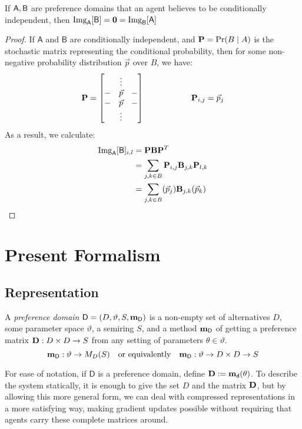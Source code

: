 \documentclass{article}
\begin{document}
	\begin{prop} \label{prop:conditionalindep}
		If $\sf A, B$ are preference domains that an agent believes to be conditionally independent, then $\mathrm{Img}_{\sf A}[{\sf B}] = \mathbf 0 = \mathrm{Img}_{\sf B}[{\sf A}] $
	\end{prop}
	\begin{proof}
		If $\mathsf A$ and $\mathsf B$ are conditionally independent, and $\mathbf P = \Pr(B \mid A)$ is the stochastic matrix representing the conditional probability, then for some non-negative probability distribution $\vec p$ over $B$, we have:
		\[ \mathbf P = \begin{bmatrix}
			& \vdots& \\
			- & \vec{p} & - \\
			- & \vec{p} & - \\
			& \vdots& \\
		\end{bmatrix} \hspace{2cm}\mathbf P_{i,j} = \vec{p}_j \]
		As a result, we calculate:
		\begin{align*}
			\mathrm{Img}_{\sf A}[{\sf B}]_{i,l} &= \mathbf P \mathbf B \mathbf P^T \\
			&= \sum_{j,k \in B} \mathbf P_{i,j} \mathbf B_{j,k} \mathbf P_{l,k} \\
			&= \sum_{j,k \in B} (\vec p_j) \mathbf B_{j,k} (\vec p_k) \\
		\end{align*}
	\end{proof}

	\section{Present Formalism}
	\subsection{Representation}
	\begin{defn}
		A \emph{preference domain} $\mathsf D = (D, \vartheta, S, \mathbf m_{\mathsf D})$ is a non-empty set of alternatives $D$, some parameter space $\vartheta$, a semiring $S$, and a method $\mathbf m_{\mathsf D}$ of getting a preference matrix $\mathbf D: D \times D \to S$ from any setting of parameters $\theta \in \vartheta$.
		\[ \mathbf m_{\mathsf D}: \vartheta \to M_D(S) \quad\text{or equivalently}\quad \mathbf m_{\mathsf D} : \vartheta \to D \times D \to S \]
		
		For ease of notation, if $\mathsf D$ is a preference domain, define $\mathbf D := \mathbf m_{\mathsf d}(\theta)$.
		To describe the system statically, it is enough to give the set $D$ and the matrix $\mathbf D$, but by allowing this more general form, we can deal with compressed representations in a more satisfying way, making gradient updates possible without requiring that agents carry these complete matrices around. 
	\end{defn}
	
\end{document}
